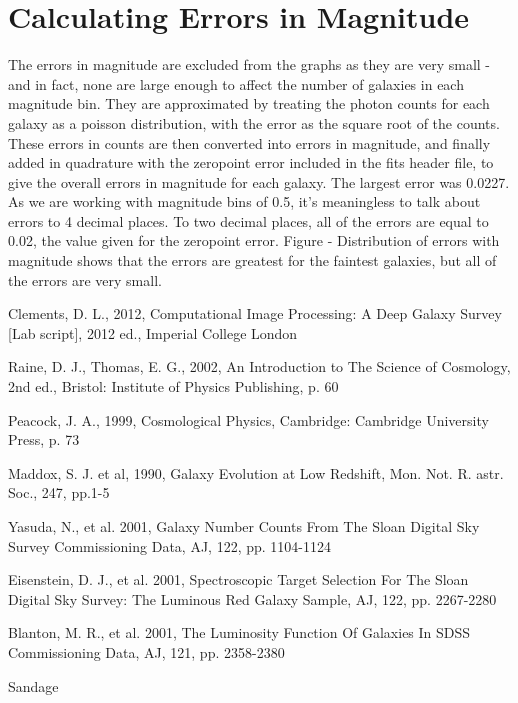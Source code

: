 \documentclass[a4paper,11pt,twoside]{article}
\begin{document}
\appendix

\section{Calculating Errors in Magnitude}

The errors in magnitude are excluded from the graphs as they are very small - and in fact, none are large enough to affect the number of galaxies in each magnitude bin. 
They are approximated by treating the photon counts for each galaxy as a poisson distribution, with the error as the square root of the counts. These errors in counts are then converted into errors in magnitude, and finally added in quadrature with the zeropoint error included in the fits header file, to give the overall errors in magnitude for each galaxy. The largest error was 0.0227. As we are working with magnitude bins of 0.5, it's meaningless to talk about errors to 4 decimal places. To two decimal places, all of the errors are equal to 0.02, the value given for the zeropoint error. 
Figure - Distribution of errors with magnitude shows that the errors are greatest for the faintest galaxies, but all of the errors are very small.


\begin{thebibliography}{9}

Clements, D. L., 2012, Computational Image Processing: A Deep Galaxy Survey [Lab script], 2012 ed., Imperial College London

Raine, D. J., Thomas, E. G., 2002, An Introduction to The Science of Cosmology, 2nd ed., Bristol: Institute of Physics Publishing, p. 60

Peacock, J. A., 1999, Cosmological Physics, Cambridge: Cambridge University Press, p. 73

Maddox, S. J. et al, 1990, Galaxy Evolution at Low Redshift, Mon. Not. R. astr. Soc., 247, pp.1-5

Yasuda, N., et al. 2001, Galaxy Number Counts From The Sloan Digital Sky Survey Commissioning Data, AJ, 122, pp. 1104-1124

Eisenstein, D. J., et al. 2001, Spectroscopic Target Selection For The Sloan Digital Sky Survey: The Luminous Red Galaxy Sample, AJ, 122, pp. 2267-2280

Blanton, M. R., et al. 2001, The Luminosity Function Of Galaxies In SDSS Commissioning Data, AJ, 121, pp. 2358-2380

Sandage

\end{thebibliography}
\end{document}
